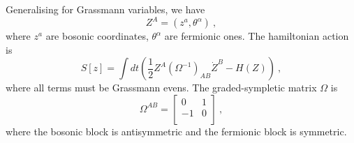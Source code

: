     Generalising for Grassmann variables, we have 
    \begin{equation*}
        Z^A = (z^a, \theta^\alpha) ~,
    \end{equation*}
    where $z^a$ are bosonic coordinates, $\theta^\alpha$ are fermionic ones. The hamiltonian action is 
    \begin{equation*}
        S[z] = \int dt (\frac{1}{2} Z^A (\Omega^{-1})_{AB} \dot Z^B - H(Z)) ~,
    \end{equation*}
    where all terms must be Grassmann evens. The graded-sympletic matrix $\Omega$ is 
    \begin{equation*}
        \Omega^{AB} = \begin{bmatrix}
            0 & 1  \\ -1 & 0 \\
        \end{bmatrix} ~,
    \end{equation*}
    where the bosonic block is antisymmetric and the fermionic block is symmetric. 
